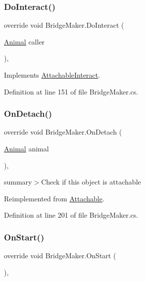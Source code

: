 \subsubsection{\texorpdfstring{Do\+Interact()}{DoInteract()}}
{\footnotesize\ttfamily override void Bridge\+Maker.\+Do\+Interact (\begin{DoxyParamCaption}\item[{\mbox{\hyperlink{class_animal}{Animal}}}]{caller }\end{DoxyParamCaption})\hspace{0.3cm}{\ttfamily [protected]}, {\ttfamily [virtual]}}



Implements \mbox{\hyperlink{class_attachable_interact_a9b07a54f1dbb96777c4bd287dfe438e3}{Attachable\+Interact}}.



Definition at line 151 of file Bridge\+Maker.\+cs.

\mbox{\label{class_bridge_maker_a5d9583fb209bfca47eabb33ce0bbe1bf}} 
\subsubsection{\texorpdfstring{On\+Detach()}{OnDetach()}}
{\footnotesize\ttfamily override void Bridge\+Maker.\+On\+Detach (\begin{DoxyParamCaption}\item[{\mbox{\hyperlink{class_animal}{Animal}}}]{animal }\end{DoxyParamCaption})\hspace{0.3cm}{\ttfamily [protected]}, {\ttfamily [virtual]}}



summary$>$Check if this object is attachable



Reimplemented from \mbox{\hyperlink{class_attachable_abe7cf9d7930393610c7c9c4ae14b12d7}{Attachable}}.



Definition at line 201 of file Bridge\+Maker.\+cs.

\mbox{\label{class_bridge_maker_a5aeea9e7555a542ec1d1fab4e3a9126f}} 
\subsubsection{\texorpdfstring{On\+Start()}{OnStart()}}
{\footnotesize\ttfamily override void Bridge\+Maker.\+On\+Start (\begin{DoxyParamCaption}{ }\end{DoxyParamCaption})\hspace{0.3cm}{\ttfamily [protected]}, {\ttfamily [virtual]}}



